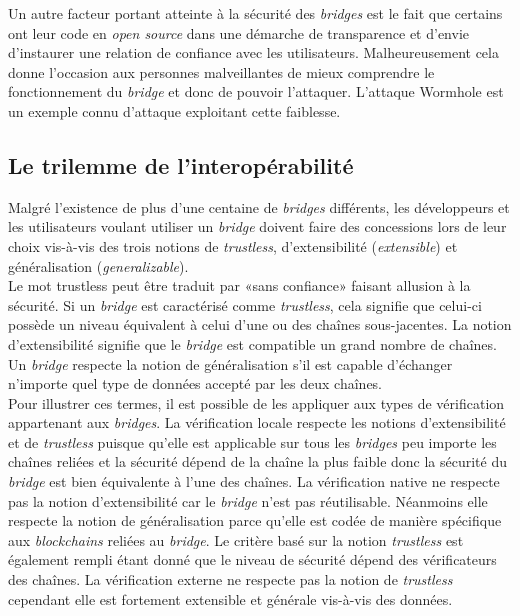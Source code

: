 Un autre facteur portant atteinte à la sécurité des \textit{bridges} est le fait que certains ont leur code en \textit{open source} dans une démarche de transparence et d’envie d’instaurer une relation de confiance avec les utilisateurs. Malheureusement cela donne l’occasion aux personnes malveillantes de mieux comprendre le fonctionnement du \textit{bridge} et donc de pouvoir l’attaquer. L’attaque Wormhole est un exemple connu d’attaque exploitant cette faiblesse.


\subsection{Le trilemme de l’interopérabilité}

Malgré l’existence de plus d’une centaine de \textit{bridges} différents, les développeurs et les utilisateurs voulant utiliser un \textit{bridge} doivent faire des concessions lors de leur choix vis-à-vis des trois notions de \textit{trustless}, d’extensibilité (\textit{extensible}) et généralisation (\textit{generalizable}).\\

Le mot trustless peut être traduit par «sans confiance» faisant allusion à la sécurité. Si un \textit{bridge} est caractérisé comme \textit{trustless}, cela signifie que celui-ci possède un niveau équivalent à celui d’une ou des chaînes sous-jacentes.  La notion  d’extensibilité signifie que le \textit{bridge} est compatible un grand nombre de chaînes.
Un \textit{bridge} respecte la notion de généralisation s’il est capable d'échanger n’importe quel type de données accepté par les deux chaînes.\\

Pour illustrer ces termes, il est possible de les appliquer aux types de vérification appartenant aux \textit{bridges}. La vérification locale respecte les notions d’extensibilité et de \textit{trustless} puisque qu'elle est applicable sur tous les \textit{bridges} peu importe les chaînes reliées et la sécurité dépend de la chaîne la plus faible donc la sécurité du \textit{bridge} est bien équivalente à l’une des chaînes.
La vérification native ne respecte pas la notion d’extensibilité car le \textit{bridge} n’est pas réutilisable. Néanmoins elle respecte la notion de généralisation parce qu’elle est codée de manière spécifique aux \textit{blockchains} reliées au \textit{bridge}. Le critère basé sur la notion \textit{trustless} est également rempli étant donné que le niveau de sécurité dépend des vérificateurs des chaînes.
La vérification externe ne respecte pas la notion de \textit{trustless} cependant elle est fortement extensible et générale vis-à-vis des données. \cite{NgraveVerif}

